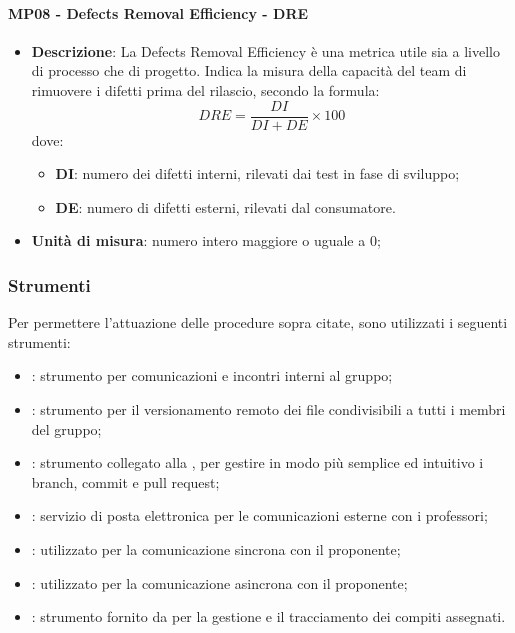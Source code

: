  		\paragraph{MP08 - Defects Removal Efficiency - DRE}
 		\begin{itemize}
 			\item \textbf{Descrizione}:
 			La Defects Removal Efficiency è una metrica utile sia a livello di processo che di progetto. Indica la misura della capacità del team di rimuovere i difetti prima del rilascio, secondo la formula:
 			\begin{displaymath}
 				DRE = \frac{DI}{DI+DE}\times100
 			\end{displaymath}
 			dove:
 			\begin{itemize}
 				\item {\bfseries DI}: numero dei difetti interni, rilevati dai test in fase di sviluppo;
 				\item {\bfseries DE}: numero di difetti esterni, rilevati dal consumatore.
 			\end{itemize}
 			\item \textbf{Unità di misura}: numero intero maggiore o uguale a 0; \\
 		\end{itemize}

 	\subsubsection{Strumenti}
 	Per permettere l'attuazione delle procedure sopra citate, sono utilizzati i seguenti strumenti:
 	\begin{itemize}
 		\item \textbf{}: strumento per comunicazioni e incontri interni al gruppo;
 		\item \textbf{}: strumento per il versionamento remoto dei file condivisibili a tutti i membri del gruppo;
 		\item \textbf{}: strumento collegato alla  , per gestire in modo più semplice ed intuitivo i branch, commit e pull request;
 		\item \textbf{}: servizio di posta elettronica per le comunicazioni esterne con i professori;
        \item \textbf{}: utilizzato per la comunicazione sincrona con il proponente;
        \item \textbf{}: utilizzato per la comunicazione asincrona con il proponente;
 		\item {\bfseries {}}: strumento fornito da  per la gestione e il tracciamento dei compiti assegnati.
 	\end{itemize}
